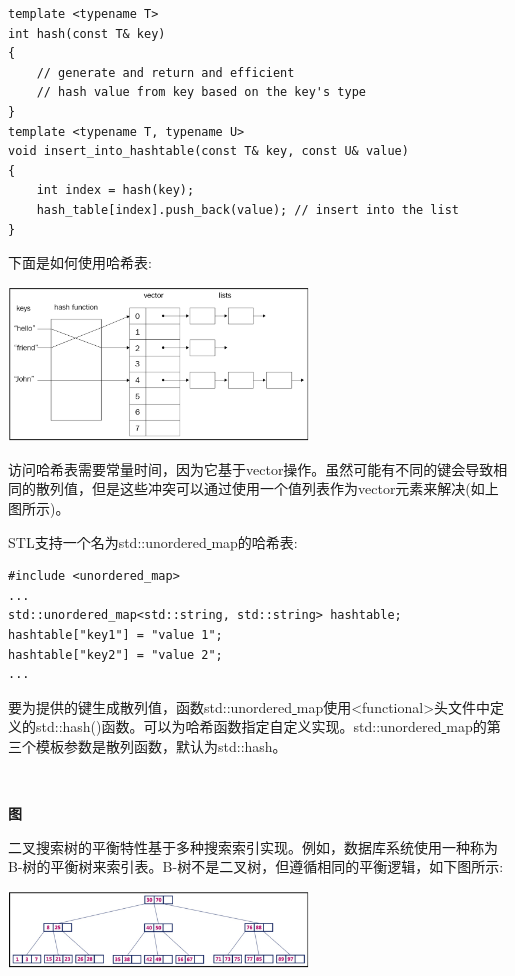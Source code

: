 \begin{lstlisting}[caption={}]
template <typename T>
int hash(const T& key)
{
	// generate and return and efficient
	// hash value from key based on the key's type
}
template <typename T, typename U>
void insert_into_hashtable(const T& key, const U& value)
{
	int index = hash(key);
	hash_table[index].push_back(value); // insert into the list
}
\end{lstlisting}

下面是如何使用哈希表: \par

\begin{center}
	\includegraphics[width=0.6\textwidth]{content/Section-2/Chapter-6/25}
\end{center}

访问哈希表需要常量时间，因为它基于vector操作。虽然可能有不同的键会导致相同的散列值，但是这些冲突可以通过使用一个值列表作为vector元素来解决(如上图所示)。 \par
STL支持一个名为std::unordered\underline{ }map的哈希表: \par

\begin{lstlisting}[caption={}]
#include <unordered_map>
...
std::unordered_map<std::string, std::string> hashtable;
hashtable["key1"] = "value 1";
hashtable["key2"] = "value 2";
...
\end{lstlisting}

要为提供的键生成散列值，函数std::unordered\underline{ }map使用<functional>头文件中定义的std::hash()函数。可以为哈希函数指定自定义实现。std::unordered\underline{ }map的第三个模板参数是散列函数，默认为std::hash。 \par

\noindent\textbf{}\ \par
\textbf{图} \ \par
二叉搜索树的平衡特性基于多种搜索索引实现。例如，数据库系统使用一种称为B-树的平衡树来索引表。B-树不是二叉树，但遵循相同的平衡逻辑，如下图所示: \par

\begin{center}
	\includegraphics[width=0.6\textwidth]{content/Section-2/Chapter-6/26}
\end{center}

